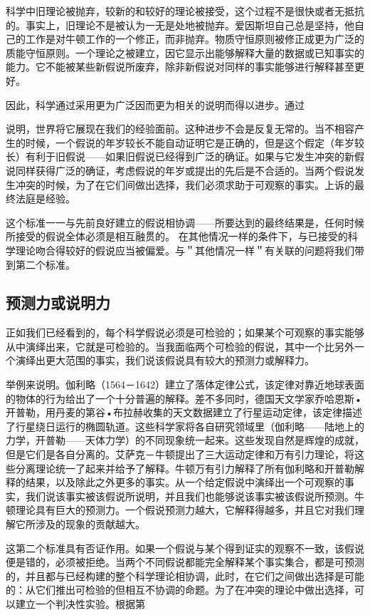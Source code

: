 科学中旧理论被抛弃，较新的和较好的理论被接受，这个过程不是很快或者无抵抗的。事实上，旧理论不是被认为一无是处地被抛弃。爱因斯坦自己总是坚持，他自己的工作是对牛顿工作的一个修正，而非抛弃。物质守恒原则被修正成更为广泛的质能守恒原则。一个理论之被建立，因它显示出能够解释大量的数据或已知事实的能力。它不能被某些新假说所废弃，除非新假说对同样的事实能够进行解释甚至更好。

因此，科学通过采用更为广泛因而更为相关的说明而得以进步。通过

说明，世界将它展现在我们的经验面前。这种进步不会是反复无常的。当不相容产生的时候，一个假说的年岁较长不能自动证明它是正确的，但是这个假定（年岁较长）有利于旧假说——如果旧假说已经得到广泛的确证。如果与它发生冲突的新假说同样获得广泛的确证，考虑假说的年岁或提出的先后是不合适的。当两个假说发生冲突的时候，为了在它们间做出选择，我们必须求助于可观察的事实。上诉的最终法庭是经验。

这个标准一一与先前良好建立的假说相协调——所要达到的最终结果是，任何时候所接受的假说全体必须是相互融贯的。\cite{blanshard1939} 在其他情况一样的条件下，与已接受的科学理论吻合得较好的假说应当被偏爱。与＂其他情况一样＂有关联的问题将我们带到第二个标准。

\subsection{预测力或说明力}
正如我们已经看到的，每个科学假说必须是可检验的；如果某个可观察的事实能够从中演绎出来，它就是可检验的。当我面临两个可检验的假说，其中一个比另外一个演绎出更大范围的事实，我们说该假说具有较大的预测力或解释力。

举例来说明。伽利略（1564－1642）建立了落体定律公式，该定律对靠近地球表面的物体的行为给出了一个十分普遍的解释。差不多同时，德国天文学家乔哈恩斯•开普勒，用丹麦的第谷•布拉赫收集的天文数据建立了行星运动定律，该定律描述了行星绕日运行的椭圆轨道。这些科学家将各自研究领域里（伽利略——陆地上的力学，开普勒——天体力学）的不同现象统一起来。这些发现自然是辉煌的成就，但是它们是各自分离的。艾萨克－牛顿提出了三大运动定律和万有引力理论，将这些分离理论统一了起来并给予了解释。牛顿万有引力解释了所有伽利略和开普勒解释的结果，以及除此之外更多的事实。从一个给定假说中演绎出一个可观察的事实，我们说该事实被该假说所说明，并且我们也能够说该事实被该假说所预测。牛顿理论具有巨大的预测力。一个假说预测力越大，它解释得越多，并且它对我们理解它所涉及的现象的贡献越大。\cite{braithwaite1960}

这第二个标准具有否证作用。如果一个假说与某个得到证实的观察不一致，该假说便是错的，必须被拒绝。当两个不同假说都能完全解释某个事实集合，都是可预测的，并且都与已经构建的整个科学理论相协调，此时，在它们之间做出选择是可能的：从它们推出可检验的但相互不协调的命题。为了在冲突的理论中做出选择，可以建立一个判决性实验。根据第

